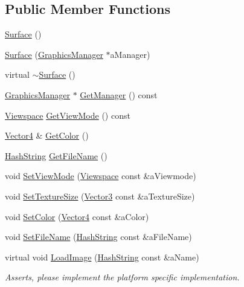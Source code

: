 \subsection*{Public Member Functions}
\begin{DoxyCompactItemize}
\item 
\hyperlink{classSurface_a8fc57f2a15292135c00545c9d224ec68}{Surface} ()
\item 
\hyperlink{classSurface_a931c648df6d3dc8c8b301dbc4ce34809}{Surface} (\hyperlink{classGraphicsManager}{Graphics\+Manager} $\ast$a\+Manager)
\item 
virtual \hyperlink{classSurface_a89de75c95cb550d432f3ea4ed1429db0}{$\sim$\+Surface} ()
\item 
\hyperlink{classGraphicsManager}{Graphics\+Manager} $\ast$ \hyperlink{classSurface_a8768f73c25896fa5d05b5fcda38d34ee}{Get\+Manager} () const 
\item 
\hyperlink{Surface_8h_a4fa0651be6bee50d62c7c9166114f6fe}{Viewspace} \hyperlink{classSurface_ad37870a954209590d1214a9061922052}{Get\+View\+Mode} () const 
\item 
\hyperlink{structVector4}{Vector4} \& \hyperlink{classSurface_a189a2849426d0aa832bf5d3acde61d52}{Get\+Color} ()
\item 
\hyperlink{classHashString}{Hash\+String} \hyperlink{classSurface_ad8f11dc73de76bd66d835672fbace1ce}{Get\+File\+Name} ()
\item 
void \hyperlink{classSurface_a044c347d9bcc9cc4957469583007cbf7}{Set\+View\+Mode} (\hyperlink{Surface_8h_a4fa0651be6bee50d62c7c9166114f6fe}{Viewspace} const \&a\+Viewmode)
\item 
void \hyperlink{classSurface_a9b4a542382c114455f66aa1bf11f7369}{Set\+Texture\+Size} (\hyperlink{structVector3}{Vector3} const \&a\+Texture\+Size)
\item 
void \hyperlink{classSurface_a374b2c6a89c8fcbc3c3bf932c9218313}{Set\+Color} (\hyperlink{structVector4}{Vector4} const \&a\+Color)
\item 
void \hyperlink{classSurface_a27551307057fdb923739146d1c87dd6a}{Set\+File\+Name} (\hyperlink{classHashString}{Hash\+String} const \&a\+File\+Name)
\item 
virtual void \hyperlink{classSurface_a634f4bfe638855b7ef0cb889feebaac3}{Load\+Image} (\hyperlink{classHashString}{Hash\+String} const \&a\+Name)
\begin{DoxyCompactList}\small\item\em Asserts, please implement the platform specific implementation. \end{DoxyCompactList}\item 

\end{DoxyCompactItemize}
